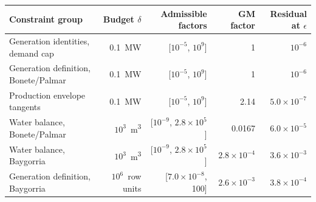 \begin{tabular}{lrrrr}
\toprule
Constraint group & Budget $\delta$ & Admissible factors & GM factor & Residual at $\epsilon$ \\
\midrule
Generation identities, demand cap & 0.1~MW & [$10^{-5}$, $10^{9}$] & 1 & $10^{-6}$ \\
Generation definition, Bonete/Palmar & 0.1~MW & [$10^{-5}$, $10^{9}$] & 1 & $10^{-6}$ \\
Production envelope tangents & 0.1~MW & [$10^{-5}$, $10^{9}$] & 2.14 & $5.0\times10^{-7}$ \\
Water balance, Bonete/Palmar & $10^{3}$~m\textsuperscript{3} & [$10^{-9}$, $2.8\times10^{5}$] & 0.0167 & $6.0\times10^{-5}$ \\
Water balance, Baygorria & $10^{3}$~m\textsuperscript{3} & [$10^{-9}$, $2.8\times10^{5}$] & $2.8\times10^{-4}$ & $3.6\times10^{-3}$ \\
Generation definition, Baygorria & $10^{6}$~row units & [$7.0\times10^{-8}$, 100] & $2.6\times10^{-3}$ & $3.8\times10^{-4}$ \\
\bottomrule
\end{tabular}
